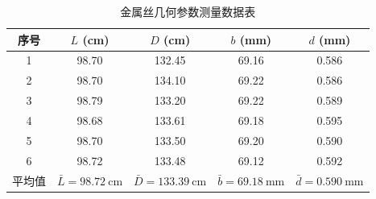 \documentclass{../template/Report}%
\begin{document}
\begin{fullreportonly}
    \begin{table}[H]
        \centering
        \caption{金属丝几何参数测量数据表}
        \begin{tabular}{ccccc}
            \toprule
            序号  & $L$ (\si{\centi\meter})              & $D$ (\si{\centi\meter})               & $b$ (\si{\milli\meter})              & $d$ (\si{\milli\meter})              \\
            \midrule
            1   & 98.70                                & 132.45                                & 69.16                                & 0.586                                \\
            2   & 98.70                                & 134.10                                & 69.22                                & 0.586                                \\
            3   & 98.79                                & 133.20                                & 69.22                                & 0.589                                \\
            4   & 98.68                                & 133.61                                & 69.18                                & 0.595                                \\
            5   & 98.70                                & 133.50                                & 69.20                                & 0.590                                \\
            6   & 98.72                                & 133.48                                & 69.12                                & 0.592                                \\
            \midrule
            平均值 & $\bar{L} = \SI{98.72}{\centi\meter}$ & $\bar{D} = \SI{133.39}{\centi\meter}$ & $\bar{b} = \SI{69.18}{\milli\meter}$ & $\bar{d} = \SI{0.590}{\milli\meter}$ \\
            \bottomrule
        \end{tabular}
    \end{table}


\end{fullreportonly}
\end{document}
